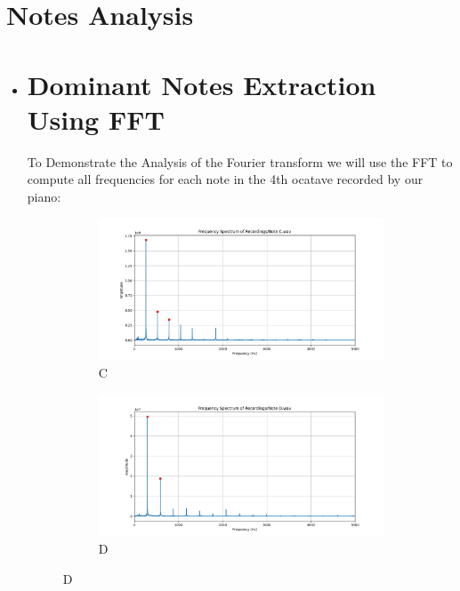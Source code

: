 \documentclass{article}
\begin{document}
\section*{Notes Analysis}
\begin{itemize}
     \item{ \section* {Dominant Notes Extraction Using FFT}}


To Demonstrate the Analysis of the Fourier transform we will use the FFT to compute all frequencies for each note in the 4th ocatave recorded by our piano:
\renewcommand{\thesubfigure}{\arabic{subfigure})}
    \begin{figure}[H] 
    \centering
    \begin{subfigure}{0.49\textwidth}
        \includegraphics[width=\textwidth]{C Note.png}
        \caption{C}
        \label{fig:C4_Note}
    \end{subfigure}
    \begin{subfigure}{0.49\textwidth}
        \includegraphics[width=\textwidth]{D Note.png}
        \caption{D}
        \label{fig:D4_Note}
    \end{subfigure}

\end{figure}
\end{itemize}
\end{document}
